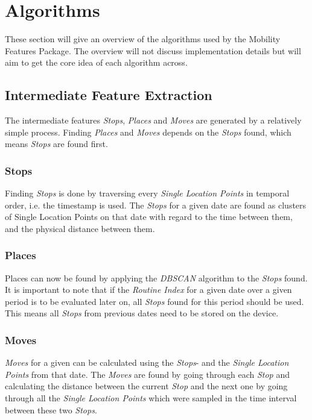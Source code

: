 \section{Algorithms}
These section will give an overview of the algorithms used by the Mobility Features Package. The overview will not discuss implementation details but will aim to get the core idea of each algorithm across.

\subsection{Intermediate Feature Extraction}
The intermediate features \textit{Stops}, \textit{Places} and \textit{Moves} are generated by a relatively simple process. Finding \textit{Places} and \textit{Moves} depends on the \textit{Stops} found, which means \textit{Stops} are found first. 

\subsubsection*{Stops}
Finding \textit{Stops} is done by traversing every \textit{Single Location Points} in temporal order, i.e. the timestamp is used. The \textit{Stops} for a given date are found as clusters of Single Location Points on that date with regard to the time between them, and the physical distance between them. 

\subsubsection*{Places}
Places can now be found by applying the \textit{DBSCAN} algorithm to the \textit{Stops} found. It is important to note that if the \textit{Routine Index} for a given date over a given period is to be evaluated later on, all \textit{Stops} found for this period should be used. This means all \textit{Stops} from previous dates need to be stored on the device. 

\subsubsection*{Moves}
\textit{Moves} for a given can be calculated using the \textit{Stops}- and the \textit{Single Location Points} from that date. The \textit{Moves} are found by going through each \textit{Stop} and calculating the distance between the current \textit{Stop} and the next one by going through all the \textit{Single Location Points} which were sampled in the time interval between these two \textit{Stops}.

